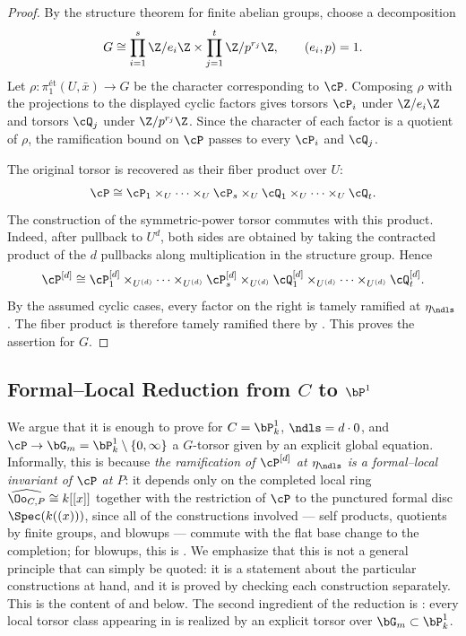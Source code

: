 \begin{proof}
By the structure theorem for finite abelian groups, choose a decomposition
\[
G \cong
\prod_{i=1}^s \Z/e_i\Z \times \prod_{j=1}^t \Z/p^{r_j}\Z,
\qquad (e_i,p)=1.
\]
Let $\rho:\pi_1^{\text{\'et}}(U,\bar{x})\to G$ be the character
corresponding to $\cP$. Composing $\rho$ with the projections to the displayed
cyclic factors gives torsors $\cP_i$ under $\Z/e_i\Z$ and torsors $\cQ_j$
under $\Z/p^{r_j}\Z$. Since the character of each factor is a quotient of
$\rho$, the ramification bound on $\cP$ passes to every $\cP_i$ and $\cQ_j$.

The original torsor is recovered as their fiber product over $U$:
\[
\cP \cong
\cP_1 \times_U \cdots \times_U \cP_s
\times_U \cQ_1 \times_U \cdots \times_U \cQ_t.
\]
The construction of the symmetric-power torsor commutes with this product.
Indeed, after pullback to $U^d$, both sides are obtained by taking the
contracted product of the $d$ pullbacks along multiplication in the structure
group. Hence
\[
\cP^{[d]} \cong
\cP_1^{[d]} \times_{U^{(d)}} \cdots \times_{U^{(d)}} \cP_s^{[d]}
\times_{U^{(d)}} \cQ_1^{[d]} \times_{U^{(d)}} \cdots
\times_{U^{(d)}} \cQ_t^{[d]}.
\]
By the assumed cyclic cases, every factor on the right is tamely ramified at
$\eta_\ndls$. The fiber product is therefore tamely ramified there by
. This proves the assertion for
$G$.
\end{proof}

\subsection{Formal--Local Reduction from \texorpdfstring{$C$}{C} to \texorpdfstring{$\bP^1$}{P1}}

We argue that it is enough to prove  for $C=\bP^1_k$, $\ndls = d \cdot 0$, and $\cP \to \bG_m = \bP^1_k \setminus \{0, \infty\}$ a $G$-torsor given by an explicit global equation.
Informally, this is because \emph{the ramification of $\cP^{[d]}$ at $\eta_\ndls$ is a formal--local invariant of $\cP$ at $P$}:
it depends only on the completed local ring $\widehat{\Oo_{C,P}} \cong k[[x]]$ together with the restriction of $\cP$
to the punctured formal disc $\Spec(k((x)))$, since all of the constructions involved --- self products, quotients by finite
groups, and blowups --- commute with the flat base change to the completion; for blowups, this is
.
We emphasize that this is not a general principle that can simply be quoted: it is a statement about the particular
constructions at hand, and it is proved by checking each construction separately. This is the content of
 and  below.
The second ingredient of the reduction is : every local torsor class appearing in
 is realized by an explicit torsor over $\bG_m \subset \bP^1_k$.

